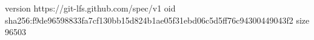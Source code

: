 version https://git-lfs.github.com/spec/v1
oid sha256:f9de96598833fa7cf130bb15d824b1ae05f31ebd06c5d5ff76c94300449043f2
size 96503

